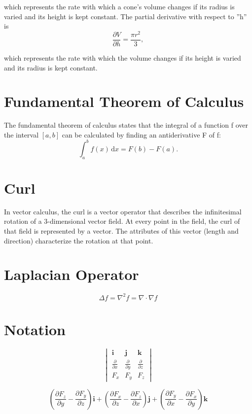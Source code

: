 \documentclass[12pt, a4paper]{article}
\begin{document}
which represents the rate with which a cone's volume changes if its radius is varied and its height is kept constant.
The partial derivative with respect to ''h'' is
\[\frac{ \partial V}{\partial h} = \frac{\pi r^2}{3},\]

which represents the rate with which the volume changes if its height is varied and its radius is kept constant.
\section{Fundamental Theorem of Calculus}
The fundamental theorem of calculus states that the integral of a function f over the interval $[a, b]$ can be calculated by finding an antiderivative F of f:
\[\int_a^b f(x)\,\mathrm dx = F(b) - F(a).\]

\section{Curl}
In vector calculus, the curl is a vector operator that describes the infinitesimal rotation of a 3-dimensional vector field. At every point in the field, the curl of that field is represented by a vector. The attributes of this vector (length and direction) characterize the rotation at that point.
\section{Laplacian Operator}
\[\Delta f = \nabla^2 f = \nabla \cdot \nabla f\]

\section{Notation}
\[ \begin{vmatrix} \mathbf{i} & \mathbf{j} & \mathbf{k} \\
{\frac{\partial}{\partial x}} & {\frac{\partial}{\partial y}} & {\frac{\partial}{\partial z}} \\
 F_x & F_y & F_z \end{vmatrix}\]

\[\left(\frac{\partial F_z}{\partial y}  - \frac{\partial F_y}{\partial z}\right) \mathbf{i} + \left(\frac{\partial F_x}{\partial z} - \frac{\partial F_z}{\partial x}\right) \mathbf{j} + \left(\frac{\partial F_y}{\partial x} - \frac{\partial F_x}{\partial y}\right) \mathbf{k}\]

\end{document}
